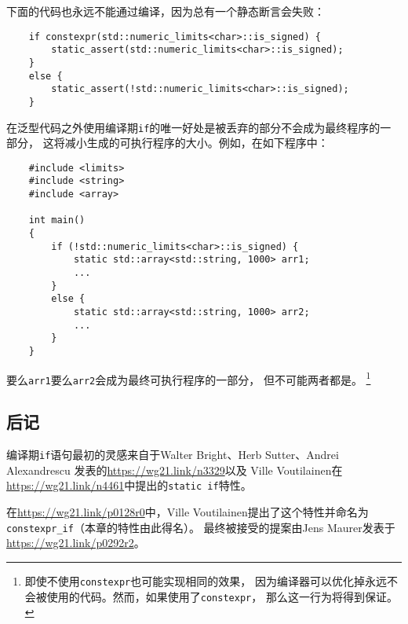 下面的代码也永远不能通过编译，因为总有一个静态断言会失败：
\begin{lstlisting}
    if constexpr(std::numeric_limits<char>::is_signed) {
        static_assert(std::numeric_limits<char>::is_signed);
    }
    else {
        static_assert(!std::numeric_limits<char>::is_signed);
    }
\end{lstlisting}
在泛型代码之外使用编译期\texttt{if}的唯一好处是被丢弃的部分不会成为最终程序的一部分，
这将减小生成的可执行程序的大小。例如，在如下程序中：
\begin{lstlisting}
    #include <limits>
    #include <string>
    #include <array>

    int main()
    {
        if (!std::numeric_limits<char>::is_signed) {
            static std::array<std::string, 1000> arr1;
            ...
        }
        else {
            static std::array<std::string, 1000> arr2;
            ...
        }
    }
\end{lstlisting}
要么\texttt{arr1}要么\texttt{arr2}会成为最终可执行程序的一部分，
但不可能两者都是。
\footnote{即使不使用\texttt{constexpr}也可能实现相同的效果，
因为编译器可以优化掉永远不会被使用的代码。然而，如果使用了\texttt{constexpr}，
那么这一行为将得到保证。}

\subsection{后记}
编译期\texttt{if}语句最初的灵感来自于Walter Bright、Herb Sutter、Andrei Alexandrescu
发表的\url{https://wg21.link/n3329}以及
Ville Voutilainen在\url{https://wg21.link/n4461}中提出的\texttt{static if}特性。

在\url{https://wg21.link/p0128r0}中，Ville Voutilainen提出了这个特性并命名为
\texttt{constexpr\_if}（本章的特性由此得名）。
最终被接受的提案由Jens Maurer发表于\url{https://wg21.link/p0292r2}。